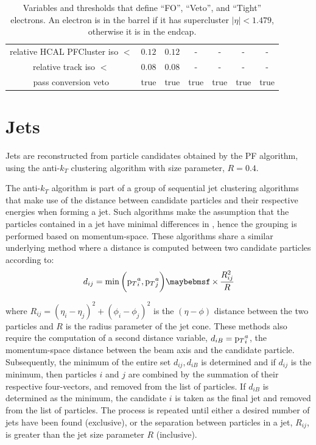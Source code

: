 \begin{table}[!ht]
\begin{tabular}{|c|c|c|c|c|c|c|}
  relative HCAL PFCluster iso $<$               & $0.12$    & $0.12$   & -         & -         & -         & - \\
  relative track iso $<$                        & $0.08$    & $0.08$    & -         & -         & -         & - \\
  pass conversion veto                          & true      & true     & true      & true      & true      & true     \\
\hline
\end{tabular}
\caption{Variables and thresholds that define ``FO'', ``Veto'', and ``Tight'' electrons. An electron is in the barrel if it has supercluster $|\eta|<1.479$, otherwise it is in the endcap.}
\label{tab:ele_wp}
\end{table}
\section{Jets}
\label{sec:jets}
Jets are reconstructed from particle candidates obtained by the PF algorithm, using the anti-$k_{T}$ clustering algorithm with size parameter, $R=0.4$.

The anti-$k_{T}$ algorithm is part of a group of sequential jet clustering algorithms that make use of the distance between candidate particles and their respective energies when forming a jet. Such algorithms make the assumption that the particles contained in a jet have minimal differences in \pt, hence the grouping is performed based on momentum-space. These algorithms share a similar underlying method where a distance is computed between two candidate particles according to:
\begin{equation}
  d_{ij} = \min\bigg(\pt_{i}^{a},\pt_{j}^{a}\bigg)\times\frac{R_{ij}^{2}}{R}
  \label{eq:seqclus}
\end{equation}

where $R_{ij} = (\eta_{i}-\eta_{j})^{2} + (\phi_{i}-\phi_{j})^{2}$ is the $(\eta-\phi)$ distance between the two particles and $R$ is the radius parameter of the jet cone. These methods also require the computation of a second distance variable, $d_{iB}={\mathrm p_{T}}_{i}^{a}$, the momentum-space distance between the beam axis and the candidate particle. Subsequently, the minimum of the entire set ${d_{ij},d_{iB}}$ is determined and if $d_{ij}$ is the minimum, then particles $i$ and $j$ are combined by the summation of their respective four-vectors, and removed from the list of particles. If $d_{iB}$ is determined as the minimum, the candidate $i$ is taken as the final jet and removed from the list of particles. The process is repeated until either a desired number of jets have been found (exclusive), or the separation between particles in a jet, $R_{ij}$, is greater than the jet size parameter $R$ (inclusive).

